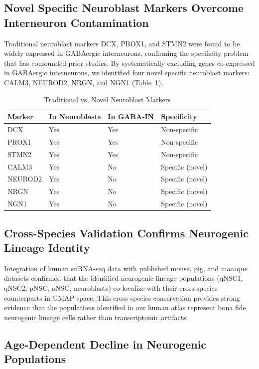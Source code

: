 \documentclass[11pt]{article}
\begin{document}
\subsection{Novel Specific Neuroblast Markers Overcome Interneuron Contamination}

Traditional neuroblast markers DCX, PROX1, and STMN2 were found to be widely expressed in GABAergic interneurons, confirming the specificity problem that has confounded prior studies. By systematically excluding genes co-expressed in GABAergic interneurons, we identified four novel specific neuroblast markers: CALM3, NEUROD2, NRGN, and NGN1 (Table~\ref{tab:markers}).

\begin{table}[ht]
\centering
\caption{Traditional vs. Novel Neuroblast Markers}
\label{tab:markers}
\begin{tabular}{llll}
\toprule
\textbf{Marker} & \textbf{In Neuroblasts} & \textbf{In GABA-IN} & \textbf{Specificity} \\
\midrule
DCX & Yes & Yes & Non-specific \\
PROX1 & Yes & Yes & Non-specific \\
STMN2 & Yes & Yes & Non-specific \\
CALM3 & Yes & No & Specific (novel) \\
NEUROD2 & Yes & No & Specific (novel) \\
NRGN & Yes & No & Specific (novel) \\
NGN1 & Yes & No & Specific (novel) \\
\bottomrule
\end{tabular}
\end{table}

\subsection{Cross-Species Validation Confirms Neurogenic Lineage Identity}

Integration of human snRNA-seq data with published mouse, pig, and macaque datasets confirmed that the identified neurogenic lineage populations (qNSC1, qNSC2, pNSC, aNSC, neuroblasts) co-localize with their cross-species counterparts in UMAP space. This cross-species conservation provides strong evidence that the populations identified in our human atlas represent bona fide neurogenic lineage cells rather than transcriptomic artifacts.

\subsection{Age-Dependent Decline in Neurogenic Populations}
\end{document}
